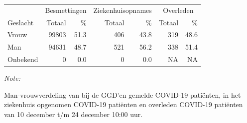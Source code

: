 \documentclass[
  english,
  man,floatsintext]{apa6}
\begin{document}
\begin{table}
\centering\begingroup\fontsize{11}{13}\selectfont

\begin{threeparttable}
\begin{tabular}{lrrrrrr}
\toprule
\multicolumn{1}{c}{ } & \multicolumn{2}{c}{Besmettingen} & \multicolumn{2}{c}{Ziekenhuisopnames} & \multicolumn{2}{c}{Overleden} \\
\cmidrule(l{3pt}r{3pt}){2-3} \cmidrule(l{3pt}r{3pt}){4-5} \cmidrule(l{3pt}r{3pt}){6-7}
Geslacht & Totaal & \% & Totaal & \% & Totaal & \%\\
\midrule
Vrouw & 99803 & 51.3 & 406 & 43.8 & 319 & 48.6\\
Man & 94631 & 48.7 & 521 & 56.2 & 338 & 51.4\\
Onbekend & 0 & 0.0 & 0 & 0.0 & NA & NA\\
\bottomrule
\end{tabular}
\begin{tablenotes}
\item \textit{Note: } 
\item Man-vrouwverdeling van bij de GGD’en gemelde COVID-19 patiënten, in het ziekenhuis opgenomen COVID-19 patiënten en overleden COVID-19 patiënten van 10 december t/m 24 december 10:00 uur.
\end{tablenotes}
\end{threeparttable}
\endgroup{}
\end{table}
\newpage
\end{document}
